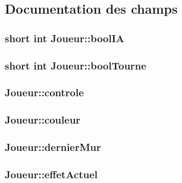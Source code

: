 \subsection{Documentation des champs}
\hypertarget{structJoueur_a2294a826a87221de10ee4aa493598493}{
\subsubsection[{bool\-I\-A}]{\setlength{\rightskip}{0pt plus 5cm}short int Joueur\-::bool\-I\-A}}\label{structJoueur_a2294a826a87221de10ee4aa493598493}
\hypertarget{structJoueur_a439aff6381e9272c2fbb737dfa2362bc}{
\subsubsection[{bool\-Tourne}]{\setlength{\rightskip}{0pt plus 5cm}short int Joueur\-::bool\-Tourne}}\label{structJoueur_a439aff6381e9272c2fbb737dfa2362bc}
\hypertarget{structJoueur_a9e673b161d97d9530f7ff108d5ea8b52}{
\subsubsection[{controle}]{ Joueur\-::controle}}\label{structJoueur_a9e673b161d97d9530f7ff108d5ea8b52}
\hypertarget{structJoueur_a966bbda4413e0b0d7aaf109660926639}{
\subsubsection[{couleur}]{ Joueur\-::couleur}}\label{structJoueur_a966bbda4413e0b0d7aaf109660926639}
\hypertarget{structJoueur_a48e6e118639e1b7f8718b0e8abb93016}{
\subsubsection[{dernier\-Mur}]{ Joueur\-::dernier\-Mur}}\label{structJoueur_a48e6e118639e1b7f8718b0e8abb93016}
\hypertarget{structJoueur_aba2ad8c2cbba6a62b7f30c76373f8b4e}{
\subsubsection[{effet\-Actuel}]{ Joueur\-::effet\-Actuel}}\label{structJoueur_aba2ad8c2cbba6a62b7f30c76373f8b4e}
